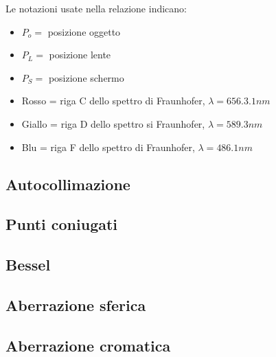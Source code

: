 Le notazioni usate nella relazione indicano:
\begin{itemize}
\item $P_o =$ posizione oggetto
\item $P_L =$ posizione lente
\item $P_S =$ posizione schermo
\item Rosso = riga C dello spettro di Fraunhofer, $\lambda = 656.3.1 nm$
\item Giallo = riga D dello spettro si Fraunhofer, $\lambda = 589.3 nm$
\item Blu = riga F dello spettro di Fraunhofer, $\lambda = 486.1 nm$
\end{itemize}
\FloatBarrier
\subsection{Autocollimazione}

\FloatBarrier
\subsection{Punti coniugati}

\FloatBarrier
\subsection{Bessel}

\FloatBarrier
\subsection{Aberrazione sferica}
\label{subsec:aberrazione_sferica}

\FloatBarrier
\subsection{Aberrazione cromatica}

